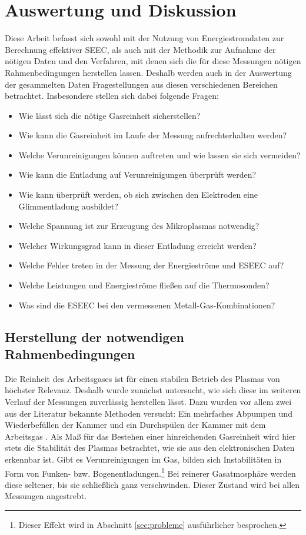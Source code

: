 \chapter{Auswertung und Diskussion}

Diese Arbeit befasst sich sowohl mit der Nutzung von Energiestromdaten zur Berechnung effektiver SEEC, als auch mit der Methodik zur Aufnahme der nötigen Daten und den Verfahren, mit denen sich die für diese Messungen nötigen Rahmenbedingungen herstellen lassen. Deshalb werden auch in der Auswertung der gesammelten Daten Fragestellungen aus diesen verschiedenen Bereichen betrachtet.
Insbesondere stellen sich dabei folgende Fragen:
\begin{itemize}
	\item Wie lässt sich die nötige Gasreinheit sicherstellen?
	\item Wie kann die Gasreinheit im Laufe der Messung aufrechterhalten werden?
	\item Welche Verunreinigungen können auftreten und wie lassen sie sich vermeiden?
	\item Wie kann die Entladung auf Verunreinigungen überprüft werden?
	\item Wie kann überprüft werden, ob sich zwischen den Elektroden eine Glimmentladung ausbildet?
	\item Welche Spannung ist zur Erzeugung des Mikroplasmas notwendig?
	\item Welcher Wirkungsgrad kann in dieser Entladung erreicht werden?
	\item Welche Fehler treten in der Messung der Energieströme und ESEEC auf?
	\item Welche Leistungen und Energieströme fließen auf die Thermosonden?
	\item Was sind die ESEEC bei den vermessenen Metall-Gas-Kombinationen?
\end{itemize}

\section{Herstellung der notwendigen Rahmenbedingungen}\label{sec:gasreinheit}

Die Reinheit des Arbeitsgases ist für einen stabilen Betrieb des Plasmas von höchster Relevanz. Deshalb wurde zunächst untersucht, wie sich diese im weiteren Verlauf der Messungen zuverlässig herstellen lässt. Dazu wurden vor allem zwei aus der Literatur bekannte Methoden versucht: Ein mehrfaches Abpumpen und Wiederbefüllen der Kammer \cite{arumugamEffectiveSecondaryElectron2017} und ein Durchspülen der Kammer mit dem Arbeitsgas \cite{hansenConventionalNonconventionalDiagnostics2022}. Als Maß für das Bestehen einer hinreichenden Gasreinheit wird hier stets die Stabilität des Plasmas betrachtet, wie sie aus den elektronischen Daten erkennbar ist. Gibt es Verunreinigungen im Gas, bilden sich Instabilitäten in Form von Funken- bzw. Bogenentladungen.\footnote{Dieser Effekt wird in Abschnitt \ref{sec:probleme} ausführlicher besprochen.} Bei reinerer Gasatmosphäre werden diese seltener, bis sie schließlich ganz verschwinden. Dieser Zustand wird bei allen Messungen angestrebt.
